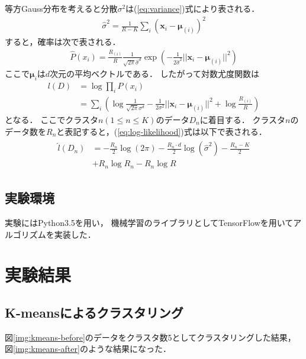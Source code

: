 \documentclass[10pt,a4j,twocolumn]{ltjsarticle}
\def\figref#1{図\ref{#1}}
\def\eqref#1{(\ref{#1})式}
\begin{document}
等方Gauss分布を考えると分散$\sigma^2$は\eqref{eq:variance}により表される．
\begin{align}
  \label{eq:variance}
  \hat{\sigma}^2 = \frac{1}{R-K}\sum_i\left({\bm x}_i-{\bm \mu}_{(i)}\right)^2
\end{align}
すると，確率は次で表される．
\begin{align}
  \label{eq:gaussian-distribution}
  \hat{P}(x_i) = \frac{R_{(i)}}{R}\frac{1}{\sqrt{2\pi}\hat{\sigma}^d}
    \exp\left(-\frac{1}{2\hat{\sigma}^2}||{\bm x}_i-{\bm \mu}_{(i)}||^2\right)
\end{align}
ここで${\bm \mu}_{i}$は$d$次元の平均ベクトルである．
したがって対数尤度関数は
\begin{align}
  \label{eq:log-likelihood}
  l(D) &= \log \prod_i P(x_i) \\\nonumber
  &= \sum_i \left( \log\frac{1}{\sqrt{2\pi}\sigma^d}-\frac{1}{2\sigma^2}||{\bm x}_i-{\bm \mu}_{(i)}||^2 + \log\frac{R_{(i)}}{R} \right)
\end{align}
となる．
ここでクラスタ$n (1 \leq n \leq K)$のデータ$D_n$に着目する．
クラスタ$n$のデータ数を$R_n$と表記すると，\eqref{eq:log-likelihood}は以下で表される．
\begin{align}
  \begin{split}
    \hat{l}(D_n) &= -\frac{R_n}{2}\log(2\pi) - \frac{R_n \cdot d}{2}\log(\hat{\sigma}^2) -
    \frac{R_n - K}{2}\\ &
    + R_n\log R_n - R_n \log R
  \end{split}
\end{align}

\subsection{実験環境}
実験にはPython3.5を用い，
機械学習のライブラリとしてTensorFlowを用いてアルゴリズムを実装した．

\section{実験結果}
\subsection{K-meansによるクラスタリング}
\figref{img:kmeans-before}のデータをクラスタ数5としてクラスタリングした結果，
\figref{img:kmeans-after}のような結果になった．
\end{document}
